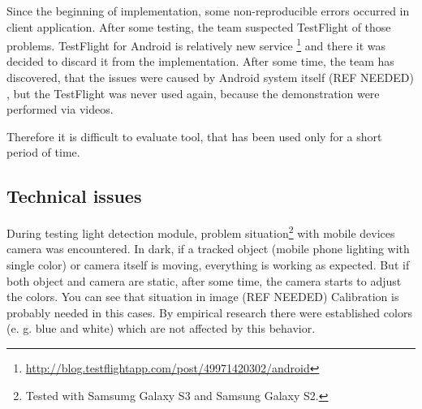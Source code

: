 Since the beginning of implementation, some non-reproducible errors occurred in client application.
After some testing, the team suspected TestFlight of those problems.
TestFlight for Android is relatively new service \footnote{\url{http://blog.testflightapp.com/post/49971420302/android}} and there it was decided to discard it from the implementation.
After some time, the team has discovered, that the issues were caused by Android system itself 
(REF NEEDED)
, but the TestFlight was never used again, because the demonstration were performed via videos.
 
Therefore it is difficult to evaluate tool, that has been used only for a short period of time.

\subsection{Technical issues}
During testing light detection module, problem situation\footnote{Tested with Samsumg Galaxy S3 and Samsung Galaxy S2.} with mobile devices camera was encountered.
In dark, if a tracked object (mobile phone lighting with single color) or camera itself is moving, everything is working as expected.
But if both object and camera are static, after some time, the camera starts to adjust the colors.
You can see that situation in image 
(REF NEEDED)
Calibration is probably needed in this cases.
By empirical research there were established colors (e. g. blue and white) which are not affected by this behavior.
